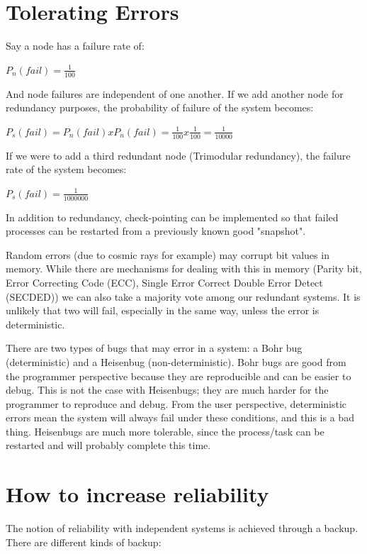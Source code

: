 \documentclass[twoside]{article}
\begin{document}
\section{Tolerating Errors}
Say a node has a failure rate of:\\

\centerline{$P_n (fail) = \frac{1}{100}$}

And node failures are independent of one another. If we add another node for redundancy purposes, the probability of failure of the system becomes:\\

\centerline{$P_s (fail) = P_n(fail) x P_n (fail) = \frac{1}{100} x \frac{1}{100} = \frac{1}{10000}$}

If we were to add a third redundant node (Trimodular redundancy), the failure rate of the system becomes:\\

\centerline{$P_s (fail) = \frac{1}{1000000}$}

In addition to redundancy, check-pointing can be implemented so that failed processes can be restarted from a previously known good "snapshot".

Random errors (due to cosmic rays for example) may corrupt bit values in memory. While there are mechanisms for dealing with this in memory (Parity bit, Error Correcting Code (ECC), Single Error Correct Double Error Detect (SECDED)) we can also take a majority vote among our redundant systems. It is unlikely that two will fail, especially in the same way, unless the error is deterministic.

There are two types of bugs that may error in a system: a Bohr bug (deterministic) and a Heisenbug (non-deterministic). Bohr bugs are good from the programmer perspective because they are reproducible and can be easier to debug. This is not the case with Heisenbugs; they are much harder for the programmer to reproduce and debug. From the user perspective, deterministic errors mean the system will always fail under these conditions, and this is a bad thing. Heisenbugs are much more tolerable, since the process/task can be restarted and will probably complete this time. 

\section{How to increase reliability}

The notion of reliability with independent systems is achieved through a backup. There are different kinds of backup:
\end{document}
